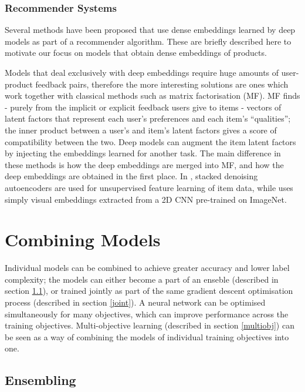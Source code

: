 \subsubsection{Recommender Systems}
\label{rec}

Several methods have been proposed that use dense embeddings learned by deep models as part of a recommender algorithm.
These are briefly described here to motivate our focus on models that obtain dense embeddings of products.

Models that deal exclusively with deep embeddings \cite{mvdl} require huge amounts of user-product feedback pairs, therefore the more interesting solutions are ones which work together with classical methods such as matrix factorisation (MF).
MF finds - purely from the implicit or explicit feedback users give to items - vectors of latent factors that represent each user's preferences and each item's ``qualities''; the inner product between a user's and item's latent factors gives a score of compatibility between the two.
Deep models can augment the item latent factors by injecting the embeddings learned for another task.
The main difference in these methods is how the deep embeddings are merged into MF, and how the deep embeddings are obtained in the first place.
In \cite{cdl}, stacked denoising autoencoders are used for unsupervised feature learning of item data, while \cite{dl_mf} uses simply visual embeddings extracted from a 2D CNN pre-trained on ImageNet.

\section{Combining Models}
\label{bg_ensembling}

Individual models can be combined to achieve greater accuracy and lower label complexity; the models can either become a part of an enseble (described in section \ref{ens}), or trained jointly as part of the same gradient descent optimisation process (described in section \ref{joint}).
A neural network can be optimised simultaneously for many objectives, which can improve performance across the training objectives.
Multi-objective learning (described in section \ref{multiobj}) can be seen as a way of combining the models of individual training objectives into one.

\subsection{Ensembling}
\label{ens}

